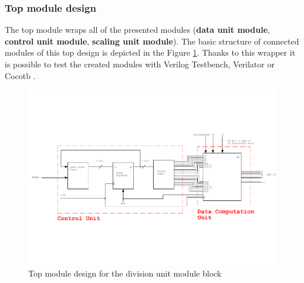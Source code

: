 \documentclass[a4paper, twoside, 11pt]{article}
\newcommand{\fbar}{\FloatBarrier}
\begin{document}
\subsubsection{Top module design}\label{subsubsec:division-top-module-design}
The top module wraps all of the presented modules (\textbf{data unit module}, \textbf{control unit module}, \textbf{scaling unit module}). The basic structure of connected modules of this top design is depicted in the Figure \ref{fig:division-top-module}. Thanks to this wrapper it is possible to test the created modules with Verilog Testbench, Verilator \cite{verilator} or Cocotb \cite{cocotb}.
\begin{figure}[htbp!]
  \centering
  \includegraphics[width=1\textwidth]{src/pdf/top-module.pdf}
   \caption{Top module design for the division unit module block}
  \label{fig:division-top-module}
\end{figure}



\fbar
\end{document}
